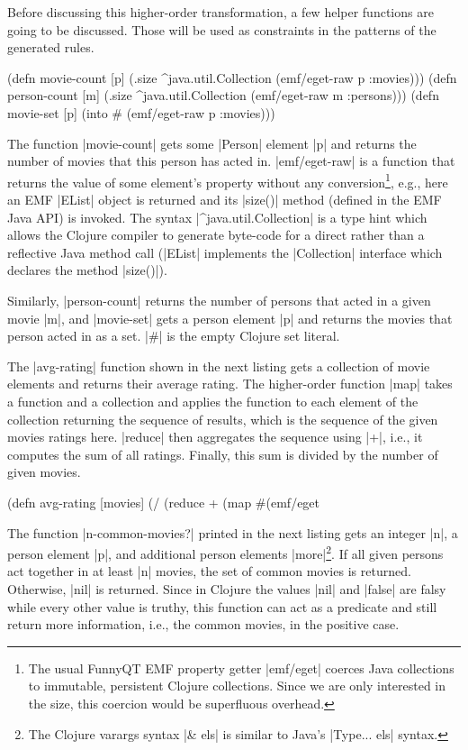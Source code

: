 \documentclass[submission]{eptcs}
\newcommand{\code}{\clojureinline}
\begin{document}
Before discussing this higher-order transformation, a few helper functions are
going to be discussed.  Those will be used as constraints in the patterns of
the generated rules.

\begin{clojurecode}
(defn movie-count [p]
  (.size ^java.util.Collection (emf/eget-raw p :movies)))
(defn person-count [m]
  (.size ^java.util.Collection (emf/eget-raw m :persons)))
(defn movie-set [p]
  (into #{} (emf/eget-raw p :movies)))
\end{clojurecode}

The function \code|movie-count| gets some \code|Person| element \code|p| and
returns the number of movies that this person has acted in.
\code|emf/eget-raw| is a function that returns the value of some element's
property without any conversion\footnote{The usual FunnyQT EMF property getter
  \code|emf/eget| coerces Java collections to immutable, persistent Clojure
  collections.  Since we are only interested in the size, this coercion would
  be superfluous overhead.}, e.g., here an EMF \code|EList| object is returned
and its \code|size()| method (defined in the EMF Java API) is invoked.  The
syntax \code|^java.util.Collection| is a type hint which allows the Clojure
compiler to generate byte-code for a direct rather than a reflective Java
method call (\code|EList| implements the \code|Collection| interface which
declares the method \code|size()|).

Similarly, \code|person-count| returns the number of persons that acted in a
given movie \code|m|, and \code|movie-set| gets a person element \code|p| and
returns the movies that person acted in as a set.  \code|#{}| is the empty
Clojure set literal.

The \code|avg-rating| function shown in the next listing gets a collection of
movie elements and returns their average rating.  The higher-order function
\code|map| takes a function and a collection and applies the function to each
element of the collection returning the sequence of results, which is the
sequence of the given movies ratings here.  \code|reduce| then aggregates the
sequence using \code|+|, i.e., it computes the sum of all ratings.  Finally,
this sum is divided by the number of given movies.

\begin{clojurecode}
(defn avg-rating [movies]
  (/ (reduce + (map #(emf/eget %
\end{clojurecode}

The function \code|n-common-movies?| printed in the next listing gets an
integer \code|n|, a person element \code|p|, and additional person elements
\code|more|\footnote{The Clojure varargs syntax \code|& els| is similar to
  Java's \code|Type... els| syntax.}.  If all given persons act together in at
least \code|n| movies, the set of common movies is returned.  Otherwise,
\code|nil| is returned.  Since in Clojure the values \code|nil| and
\code|false| are falsy while every other value is truthy, this function can act
as a predicate and still return more information, i.e., the common movies, in
the positive case.
\end{document}
